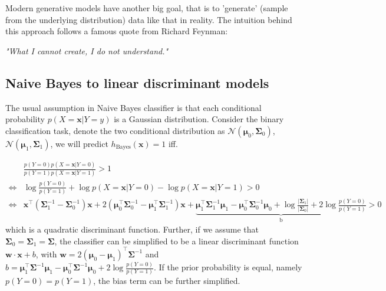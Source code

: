\documentclass{article}
\begin{document}
	Modern generative models have another big goal, that is to 'generate' (sample from the underlying distribution) data like that in reality. The intuition behind this approach follows a famous quote from Richard Feynman:	
	\begin{center}
	\textit{"What I cannot create, I do not understand."}
	\end{center}

	\subsection{Naive Bayes to linear discriminant models}
	The usual assumption in Naive Bayes classifier is that each conditional probability $p(X=\bm{x}|Y=y)$ is a Gaussian distribution. Consider the binary classification task, denote the two conditional distribution as $\mathcal{N}(\bm{\mu}_0,\bm{\Sigma}_0)$, $\mathcal{N}(\bm{\mu}_1,\bm{\Sigma}_1)$, we will predict $h_{\mathrm{Bayes}}(\bm{x})=1$ iff.
	
	\begin{equation*}
	\begin{split}
	&\frac{p(Y=0) p(X=\bm{x}|Y=0)}{p(Y=1) p(X=\bm{x}|Y=1)} > 1 \\
	\iff &\log \frac{p(Y=0)}{p(Y=1)} + \log p(X=\bm{x}|Y=0) - \log p(X=\bm{x}|Y=1) > 0 \\
	\iff &\bm{x}^\top ( \bm{\Sigma}_1^{-1} - \bm{\Sigma}_0^{-1}) \bm{x} + 2 (\bm{\mu}_0^\top\bm{\Sigma}_0^{-1} - \bm{\mu}_1^\top\bm{\Sigma}_1^{-1}) \bm{x} + \underbrace{\bm{\mu}_1^\top\bm{\Sigma}_1^{-1}\bm{\mu}_1 - \bm{\mu}_0^\top\bm{\Sigma}_0^{-1}\bm{\mu}_0 + \log\frac{|\bm{\Sigma}_1|}{|\bm{\Sigma}_0|} + 2\log \frac{p(Y=0)}{p(Y=1)}}_{\mathrm{b}} > 0
	\end{split}
	\end{equation*}
which is a quadratic discriminant function. Further, if we assume that $\bm{\Sigma}_0=\bm{\Sigma}_1=\bm{\Sigma}$, the classifier can be simplified to be a linear discriminant function $\bm{w}\cdot\bm{x}+b$, with $\bm{w}=2(\bm{\mu}_0 - \bm{\mu}_1)^\top\bm{\Sigma}^{-1}$ and $b=\bm{\mu}_1^\top\bm{\Sigma}^{-1}\bm{\mu}_1 - \bm{\mu}_0^\top\bm{\Sigma}^{-1}\bm{\mu}_0+ 2\log \frac{p(Y=0)}{p(Y=1)}$. If the prior probability is equal, namely $p(Y=0)=p(Y=1)$, the bias term can be further simplified.
	
\end{document}
